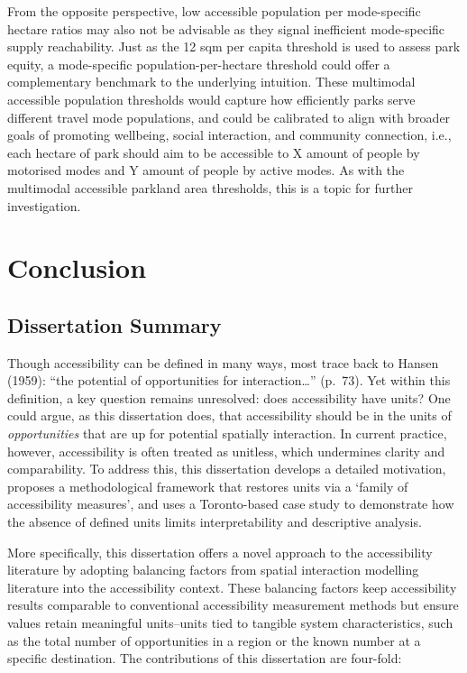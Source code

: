 \documentclass[
11pt, %
oneside, %
english, %
singlespacing, %
]{macthesis} %
\begin{document}
From the opposite perspective, low accessible population per mode-specific hectare ratios may also not be advisable as they signal inefficient mode-specific supply reachability. Just as the 12 sqm per capita threshold is used to assess park equity, a mode-specific population-per-hectare threshold could offer a complementary benchmark to the underlying intuition. These multimodal accessible population thresholds would capture how efficiently parks serve different travel mode populations, and could be calibrated to align with broader goals of promoting wellbeing, social interaction, and community connection, i.e., each hectare of park should aim to be accessible to X amount of people by motorised modes and Y amount of people by active modes. As with the multimodal accessible parkland area thresholds, this is a topic for further investigation.

\chapter*{Conclusion}\label{conclusion-1}

\section{Dissertation Summary}\label{dissertation-summary}

Though accessibility can be defined in many ways, most trace back to Hansen (1959): ``the potential of opportunities for interaction\ldots{}'' (p.~73). Yet within this definition, a key question remains unresolved: does accessibility have units? One could argue, as this dissertation does, that accessibility should be in the units of \emph{opportunities} that are up for potential spatially interaction. In current practice, however, accessibility is often treated as unitless, which undermines clarity and comparability. To address this, this dissertation develops a detailed motivation, proposes a methodological framework that restores units via a `family of accessibility measures', and uses a Toronto-based case study to demonstrate how the absence of defined units limits interpretability and descriptive analysis.

More specifically, this dissertation offers a novel approach to the accessibility literature by adopting balancing factors from spatial interaction modelling literature into the accessibility context. These balancing factors keep accessibility results comparable to conventional accessibility measurement methods but ensure values retain meaningful units--units tied to tangible system characteristics, such as the total number of opportunities in a region or the known number at a specific destination. The contributions of this dissertation are four-fold:
\end{document}
